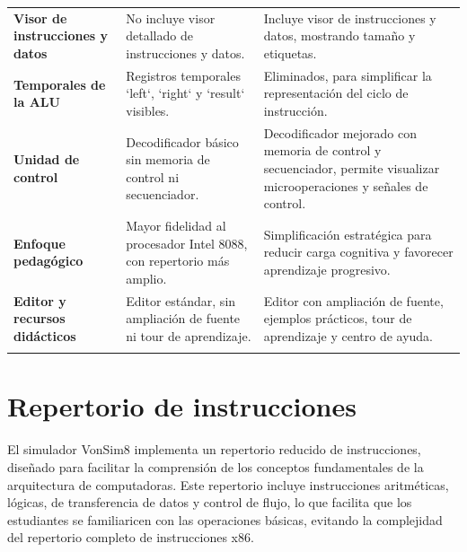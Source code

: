 \documentclass[12pt,oneside]{templates/unerthesis}
\begin{document}
\begin{table}[!h]
{\begin{tabular}[t]{>{\raggedright\arraybackslash}p{5cm}|>{\raggedright\arraybackslash}p{7cm}>{\raggedright\arraybackslash}p{8cm}}
\addlinespace[10pt]
\textbf{Visor de instrucciones y datos} & No incluye visor detallado de instrucciones y datos. & Incluye visor de instrucciones y datos, mostrando tamaño y etiquetas.\\
\addlinespace[10pt]
\textbf{Temporales de la ALU} & Registros temporales `left`, `right` y `result` visibles. & Eliminados, para simplificar la representación del ciclo de instrucción.\\
\addlinespace[10pt]
\addlinespace
\textbf{Unidad de control} & Decodificador básico sin memoria de control ni secuenciador. & Decodificador mejorado con memoria de control y secuenciador, permite visualizar microoperaciones y señales de control.\\
\addlinespace[10pt]
\textbf{Enfoque pedagógico} & Mayor fidelidad al procesador Intel 8088, con repertorio más amplio. & Simplificación estratégica para reducir carga cognitiva y favorecer aprendizaje progresivo.\\
\addlinespace[10pt]
\textbf{Editor y recursos didácticos} & Editor estándar, sin ampliación de fuente ni tour de aprendizaje. & Editor con ampliación de fuente, ejemplos prácticos, tour de aprendizaje y centro de ayuda.\\
\addlinespace[10pt]
\bottomrule
\end{tabular}}
\end{table}

\hypertarget{repertorio-de-instrucciones-1}{%
\section{Repertorio de instrucciones}\label{repertorio-de-instrucciones-1}}

El simulador VonSim8 implementa un repertorio reducido de instrucciones, diseñado para facilitar la comprensión de los conceptos fundamentales de la arquitectura de computadoras. Este repertorio incluye instrucciones aritméticas, lógicas, de transferencia de datos y control de flujo, lo que facilita que los estudiantes se familiaricen con las operaciones básicas, evitando la complejidad del repertorio completo de instrucciones x86.
\end{document}
